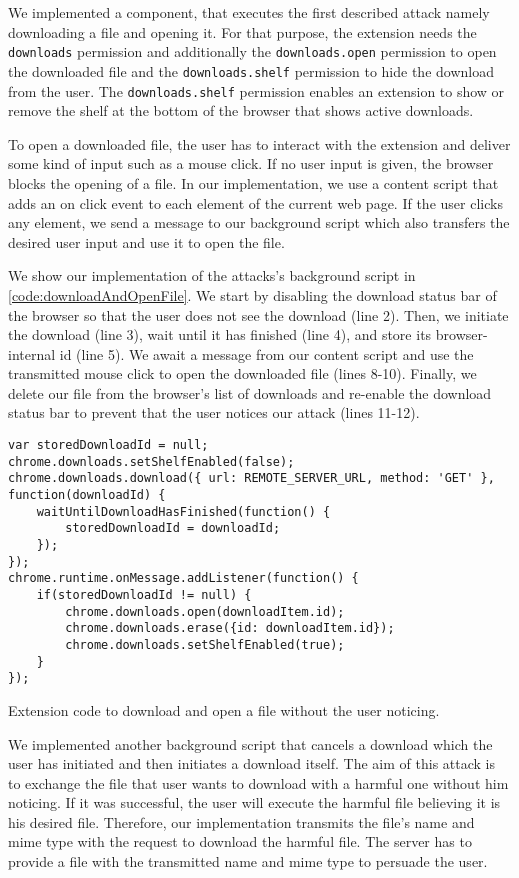 	We implemented a component, that executes the first described attack namely downloading a file and opening it. For that purpose, the extension needs the \texttt{downloads} permission and additionally the \texttt{downloads.open} permission to open the downloaded file and the \texttt{downloads.shelf} permission to hide the download from the user. The \texttt{downloads.shelf} permission enables an extension to show or remove the shelf at the bottom of the browser that shows active downloads. 
	
	To open a downloaded file, the user has to interact with the extension and deliver some kind of input such as a mouse click. If no user input is given, the browser blocks the opening of a file. In our implementation, we use a content script that adds an on click event to each element of the current web page. If the user clicks any element, we send a message to our background script which also transfers the desired user input and use it to open the file.

	We show our implementation of the attacks's background script in \autoref{code:downloadAndOpenFile}. We start by disabling the download status bar of the browser so that the user does not see the download (line 2). Then, we initiate the download (line 3), wait until it has finished (line 4), and store its browser-internal id (line 5). We await a message from our content script and use the transmitted mouse click to open the downloaded file (lines 8-10). Finally, we delete our file from the browser's list of downloads and re-enable the download status bar to prevent that the user notices our attack (lines 11-12).
	
	\begin{code}
		\begin{lstlisting}
var storedDownloadId = null;
chrome.downloads.setShelfEnabled(false);
chrome.downloads.download({	url: REMOTE_SERVER_URL,	method: 'GET' }, function(downloadId) {
	waitUntilDownloadHasFinished(function() {
		storedDownloadId = downloadId;
	});
});		
chrome.runtime.onMessage.addListener(function() {
	if(storedDownloadId != null) {
		chrome.downloads.open(downloadItem.id);
		chrome.downloads.erase({id: downloadItem.id});
		chrome.downloads.setShelfEnabled(true);
	}
});
\end{lstlisting}
		\caption{Extension code to download and open a file without the user noticing.}
		\label{code:downloadAndOpenFile}
	\end{code}
	
	We implemented another background script that cancels a download which the user has initiated and then initiates a download itself. The aim of this attack is to exchange the file that user wants to download with a harmful one without him noticing. If it was successful, the user will execute the harmful file believing it is his desired file. Therefore, our implementation transmits the file's name and mime type with the request to download the harmful file. The server has to provide a file with the transmitted name and mime type to persuade the user.
	
